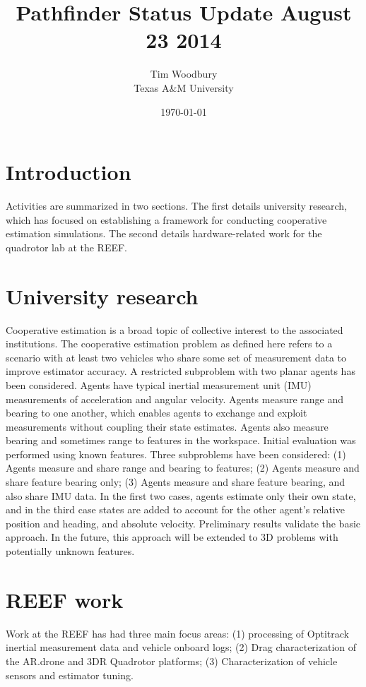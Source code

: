 \documentclass{article}
\title{Pathfinder Status Update August 23 2014}
\author{Tim Woodbury \\ \normalsize{Texas A\&M University}}
\date{\today} %
\begin{document}
\maketitle

\section{Introduction}

Activities are summarized in two sections. The first details university research, which has focused on establishing a framework for conducting cooperative estimation simulations. The second details hardware-related work for the quadrotor lab at the REEF.

\section{University research}

Cooperative estimation is a broad topic of collective interest to the associated institutions. The cooperative estimation problem as defined here refers to a scenario with at least two vehicles who share some set of measurement data to improve estimator accuracy. A restricted subproblem with two planar agents has been considered. Agents have typical inertial measurement unit (IMU) measurements of acceleration and angular velocity. Agents measure range and bearing to one another, which enables agents to exchange and exploit measurements without coupling their state estimates. Agents also measure bearing and sometimes range to features in the workspace. Initial evaluation was performed using known features. Three subproblems have been considered: (1) Agents measure and share range and bearing to features; (2) Agents measure and share feature bearing only; (3) Agents measure and share feature bearing, and also share IMU data. In the first two cases, agents estimate only their own state, and in the third case states are added to account for the other agent's relative position and heading, and absolute velocity. Preliminary results validate the basic approach. In the future, this approach will be extended to 3D problems with potentially unknown features.

\section{REEF work}

Work at the REEF has had three main focus areas: (1) processing of Optitrack inertial measurement data and vehicle onboard logs; (2) Drag characterization of the AR.drone and 3DR Quadrotor platforms; (3) Characterization of vehicle sensors and estimator tuning.
\end{document}
